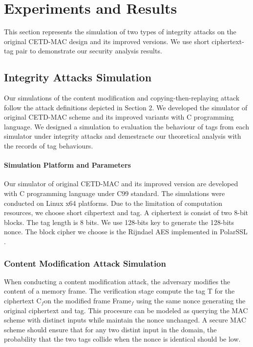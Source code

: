 \documentclass{article}
\begin{document}

\printnomenclature
\section{Experiments and Results}
This section represents the simulation of two types of integrity attacks on the original CETD-MAC design and its improved versions. We use short ciphertext-tag pair to demonstrate our security analysis results. 
\subsection{Integrity Attacks Simulation}
Our simulations of the content modification and copying-then-replaying attack follow the attack definitions depicted in Section 2. We developed the simulator of original CETD-MAC scheme and its improved variants with C programming language. We designed a simulation to evaluation the behaviour of tags from each simulator under integrity attacks and demestracte our theoretical analysis with the records of tag behaviours. 
\paragraph{Simulation Platform and Parameters}
Our simulator of original CETD-MAC and its improved version are developed with C programming language under C99 standard. The simulations were conducted on Linux x64 platforms. Due to the limitation of computation resources, we choose short cihpertext and tag. A ciphertext is consist of two 8-bit blocks. The tag length is 8 bits. We use 128-bits key to generate the 128-bits nonce. The block cipher we choose is the Rijndael AES implemented in PolarSSL \cite{}.   
\subsubsection{Content Modification Attack Simulation}
When conducting a content modification attack, the adversary modifies the content of a memory frame. The verification stage compute the tag T for the ciphertext C$_{f}$on the modified frame Frame$_{f}$ using the same nonce generating the original ciphertext and tag.
This procesure can be modeled as querying the MAC scheme with distinct inputs while maintain the nonce unchanged. A secure MAC scheme should ensure that for any two distint input in the domain, the probability that the two tags collide when the nonce is identical should be low.
\end{document}
